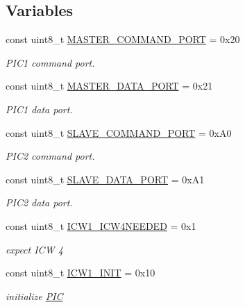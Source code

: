 \subsection*{Variables}
\begin{DoxyCompactItemize}
\item 
const uint8\+\_\+t \hyperlink{namespace_p_i_c_aae56765eb24eb75e1498e22c05ac29ee}{M\+A\+S\+T\+E\+R\+\_\+\+C\+O\+M\+M\+A\+N\+D\+\_\+\+P\+O\+RT} = 0x20
\begin{DoxyCompactList}\small\item\em P\+I\+C1 command port. \end{DoxyCompactList}\item 
const uint8\+\_\+t \hyperlink{namespace_p_i_c_a7b19e701740b8b1b19db1f1a14af63a6}{M\+A\+S\+T\+E\+R\+\_\+\+D\+A\+T\+A\+\_\+\+P\+O\+RT} = 0x21
\begin{DoxyCompactList}\small\item\em P\+I\+C1 data port. \end{DoxyCompactList}\item 
const uint8\+\_\+t \hyperlink{namespace_p_i_c_a4cdc374612119bd13b1a28e4cc82864f}{S\+L\+A\+V\+E\+\_\+\+C\+O\+M\+M\+A\+N\+D\+\_\+\+P\+O\+RT} = 0x\+A0
\begin{DoxyCompactList}\small\item\em P\+I\+C2 command port. \end{DoxyCompactList}\item 
const uint8\+\_\+t \hyperlink{namespace_p_i_c_a6e06fae4a0139a207173ff2b94be3283}{S\+L\+A\+V\+E\+\_\+\+D\+A\+T\+A\+\_\+\+P\+O\+RT} = 0x\+A1
\begin{DoxyCompactList}\small\item\em P\+I\+C2 data port. \end{DoxyCompactList}\item 
const uint8\+\_\+t \hyperlink{namespace_p_i_c_a63beb0c60fdab8c997f42291a7c2baf5}{I\+C\+W1\+\_\+\+I\+C\+W4\+N\+E\+E\+D\+ED} = 0x1
\begin{DoxyCompactList}\small\item\em expect I\+CW 4 \end{DoxyCompactList}\item 
const uint8\+\_\+t \hyperlink{namespace_p_i_c_a8bb2fc0a772eabbbf6adb002f578290e}{I\+C\+W1\+\_\+\+I\+N\+IT} = 0x10
\begin{DoxyCompactList}\small\item\em initialize \hyperlink{namespace_p_i_c}{P\+IC} \end{DoxyCompactList}\item 

\end{DoxyCompactItemize}
